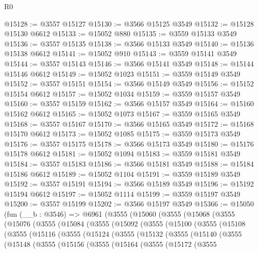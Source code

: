 \begin{lexlean}{R0}
\begin{coremodule}
@15128 := @3557 @15127
@15130 := @3566 @15125 @3549
@15132 := @15128 @15130 @6612
@15133 := @15052 @880
@15135 := @3559 @15133 @3549
@15136 := @3557 @15135
@15138 := @3566 @15133 @3549
@15140 := @15136 @15138 @6612
@15141 := @15052 @910
@15143 := @3559 @15141 @3549
@15144 := @3557 @15143
@15146 := @3566 @15141 @3549
@15148 := @15144 @15146 @6612
@15149 := @15052 @1023
@15151 := @3559 @15149 @3549
@15152 := @3557 @15151
@15154 := @3566 @15149 @3549
@15156 := @15152 @15154 @6612
@15157 := @15052 @1034
@15159 := @3559 @15157 @3549
@15160 := @3557 @15159
@15162 := @3566 @15157 @3549
@15164 := @15160 @15162 @6612
@15165 := @15052 @1073
@15167 := @3559 @15165 @3549
@15168 := @3557 @15167
@15170 := @3566 @15165 @3549
@15172 := @15168 @15170 @6612
@15173 := @15052 @1085
@15175 := @3559 @15173 @3549
@15176 := @3557 @15175
@15178 := @3566 @15173 @3549
@15180 := @15176 @15178 @6612
@15181 := @15052 @1094
@15183 := @3559 @15181 @3549
@15184 := @3557 @15183
@15186 := @3566 @15181 @3549
@15188 := @15184 @15186 @6612
@15189 := @15052 @1104
@15191 := @3559 @15189 @3549
@15192 := @3557 @15191
@15194 := @3566 @15189 @3549
@15196 := @15192 @15194 @6612
@15197 := @15052 @1114
@15199 := @3559 @15197 @3549
@15200 := @3557 @15199
@15202 := @3566 @15197 @3549
@15366 := @15050
    (fun (__b : @3546) =>
    @6961
      (@3555
        (@15060
          (@3555
            (@15068
              (@3555
                (@15076
                  (@3555
                    (@15084
                      (@3555
                        (@15092
                          (@3555
                            (@15100
                              (@3555
                                (@15108
                                  (@3555
                                    (@15116
                                      (@3555
                                        (@15124
                                          (@3555
                                            (@15132
                                              (@3555
                                                (@15140
                                                  (@3555
                                                    (@15148
                                                      (@3555
                                                        (@15156
                                                          (@3555
                                                            (@15164
                                                              (@3555
                                                                (@15172
                                                                  (@3555

\end{coremodule}
\end{lexlean}
